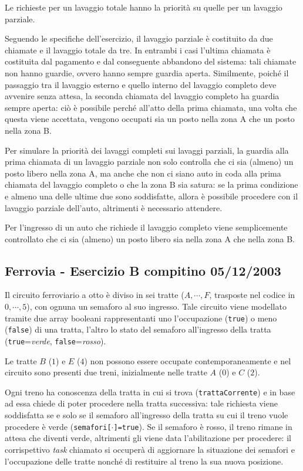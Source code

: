 \documentclass[a4paper]{scrartcl}
\begin{document}
Le richieste per un lavaggio totale hanno la priorità su quelle per un lavaggio parziale.

Seguendo le specifiche dell'esercizio, il lavaggio parziale è costituito da due chiamate e il lavaggio totale da tre. In entrambi i casi l'ultima chiamata è costituita dal pagamento e dal conseguente abbandono del sistema: tali chiamate non hanno guardie, ovvero hanno sempre guardia aperta. Similmente, poiché il passaggio tra il lavaggio esterno e quello interno del lavaggio completo deve avvenire senza attesa, la seconda chiamata del lavaggio completo ha guardia sempre aperta: ciò è possibile perché all'atto della prima chiamata, una volta che questa viene accettata, vengono occupati sia un posto nella zona A che un posto nella zona B.

Per simulare la priorità dei lavaggi completi sui lavaggi parziali, la guardia alla prima chiamata di un lavaggio parziale non solo controlla che ci sia (almeno) un posto libero nella zona A, ma anche che non ci siano auto in coda alla prima chiamata del lavaggio completo o che la zona B sia satura: se la prima condizione e almeno una delle ultime due sono soddisfatte, allora è possibile procedere con il lavaggio parziale dell'auto, altrimenti è necessario attendere.

Per l'ingresso di un auto che richiede il lavaggio completo viene semplicemente controllato che ci sia (almeno) un posto libero sia nella zona A che nella zona B.

\subsection*{Ferrovia - Esercizio B compitino 05/12/2003}
Il circuito ferroviario a otto è diviso in sei tratte ($A,\cdots , F$, trasposte nel codice in $0,\cdots , 5$), con ognuna un semaforo al suo ingresso. Tale circuito viene modellato tramite due array booleani rappresentanti uno l'occupazione (\texttt{true}) o meno (\texttt{false}) di una tratta, l'altro lo stato del semaforo all'ingresso della tratta (\texttt{true}=\textit{verde}, \texttt{false}=\textit{rosso}).

Le tratte $B$ ($1$) e $E$ ($4$) non possono essere occupate contemporaneamente e nel circuito sono presenti due treni, inizialmente nelle tratte $A$ ($0$) e $C$ ($2$).

Ogni treno ha conoscenza della tratta in cui si trova (\texttt{trattaCorrente}) e in base ad essa chiede di poter procedere nella tratta successiva: tale richiesta viene soddisfatta se e solo se il semaforo all'ingresso della tratta su cui il treno vuole procedere è verde (\texttt{semafori[$\cdot$]=true}). Se il semaforo è rosso, il treno rimane in attesa che diventi verde, altrimenti gli viene data l'abilitazione per procedere: il corrispettivo \textit{task} chiamato si occuperà di aggiornare la situazione dei semafori e l'occupazione delle tratte nonché di restituire al treno la sua nuova posizione.
\end{document}
